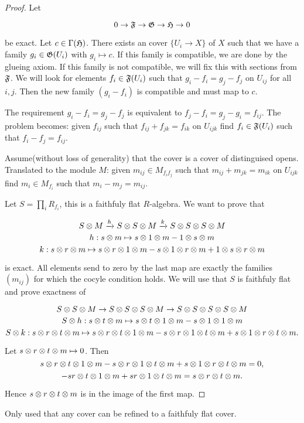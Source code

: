 \begin{proof}
Let

\[0 \rightarrow \mathfrak{F} \rightarrow \mathfrak{G} \rightarrow \mathfrak{H} \rightarrow 0\]

be exact.
Let $c\in \Gamma(\mathfrak{H})$. There exists an cover $\{U_i\rightarrow X\}$ of $X$ such that we have a family $g_i\in \mathfrak{G}(U_i)$ with $g_i\mapsto c$.
If this family is compatible, we are done by the glueing axiom. If this family is not compatible, we will fix this with sections from $\mathfrak{F}$.
We will look for elements $f_i\in \mathfrak{F}(U_i)$ such that $g_i-f_i=g_j-f_j$ on $U_{ij}$ for all $i,j$. 
Then the new family $(g_i-f_i)$ is compatible and must map to $c$.

The requirement $g_i-f_i=g_j-f_j$ is equivalent to $f_j-f_i=g_j-g_i=f_{ij}$. 
The problem becomes: given $f_{ij}$ such that $f_{ij}+f_{jk}=f_{ik}$ on $U_{ijk}$ find $f_i\in\mathfrak{F}(U_i)$ such that $f_i-f_j =f_{ij}$.

Assume(without loss of generality) that the cover is a cover of distinguised opens.
Translated to the module $M$: given $m_{ij}\in M_{f_if_j}$ such that $m_{ij}+m_{jk}=m_{ik}$ on $U_{ijk}$ find $m_i\in M_{f_i}$ such that $m_i-m_j =m_{ij}$.

Let $S=\prod_i R_{f_i}$, this is a faithfuly flat $R$-algebra.
We want to prove that

\[S\otimes M \xrightarrow{h} S\otimes S\otimes M \xrightarrow{k} S\otimes S\otimes S\otimes M \]
\[h:s\otimes m \mapsto s\otimes 1 \otimes m - 1\otimes s\otimes m\]
\[k:s\otimes r\otimes m \mapsto s\otimes r \otimes 1 \otimes m - s\otimes 1 \otimes r \otimes m + 1\otimes s \otimes r \otimes m\]

is exact. All elements send to zero by the last map are exactly the families $(m_{ij})$ for which the cocyle condition holds.
We will use that $S$ is faithfuly flat and prove exactness of 


\[S\otimes S\otimes M \rightarrow S\otimes S\otimes S \otimes M \rightarrow S \otimes S\otimes S\otimes S\otimes M \]
\[S\otimes h:s\otimes t \otimes m \mapsto s\otimes t\otimes 1 \otimes m - s\otimes 1\otimes 1\otimes m \]
\[S\otimes k:s\otimes r\otimes t \otimes m \mapsto s\otimes r \otimes  t \otimes 1 \otimes m - s\otimes r \otimes 1 \otimes t \otimes m + s\otimes 1 \otimes r \otimes t\otimes m.\]


Let $s\otimes r\otimes t\otimes m\mapsto 0$. Then
\[s\otimes r \otimes  t \otimes 1 \otimes m - s\otimes r \otimes 1 \otimes t \otimes m + s\otimes 1 \otimes r \otimes t\otimes m = 0,\]
\[-sr \otimes  t \otimes 1 \otimes m + sr \otimes 1 \otimes t \otimes m = s\otimes r \otimes t\otimes m.\]

Hence $s\otimes r \otimes t\otimes m$ is in the image of the first map. 
\end{proof}

Only used that any cover can be refined to a faithfuly flat cover.
